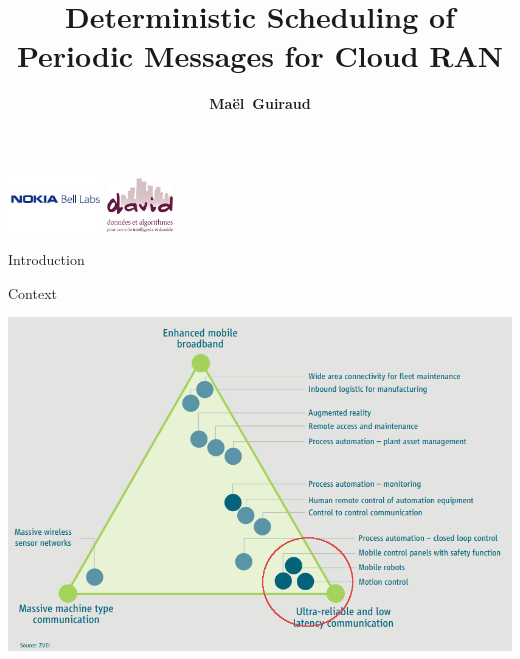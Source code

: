 \documentclass[10 pt]{beamer}
\title{Deterministic Scheduling of Periodic Messages for Cloud RAN}
\author{{\bf Maël~Guiraud}}
\institute[Nokia Bell Labs, DAVID-UVSQ] 
{

   Nokia Bell Labs France - DAVID, Universit\'e de Versailles Saint Quentin 
 \\
}
\begin{document}
\begin{frame}

  \titlepage
  \centering
  \includegraphics [width=25mm]{logon.png} \hspace{1cm} \includegraphics [width=17.5mm]{logod.png} \\
\end{frame}




\begin{section}{Introduction}

\begin{frame}{Context}


  \centering
  
  \includegraphics[scale=0.4]{usecases.png}
  

\end{frame}



\end{section}
\end{document}
